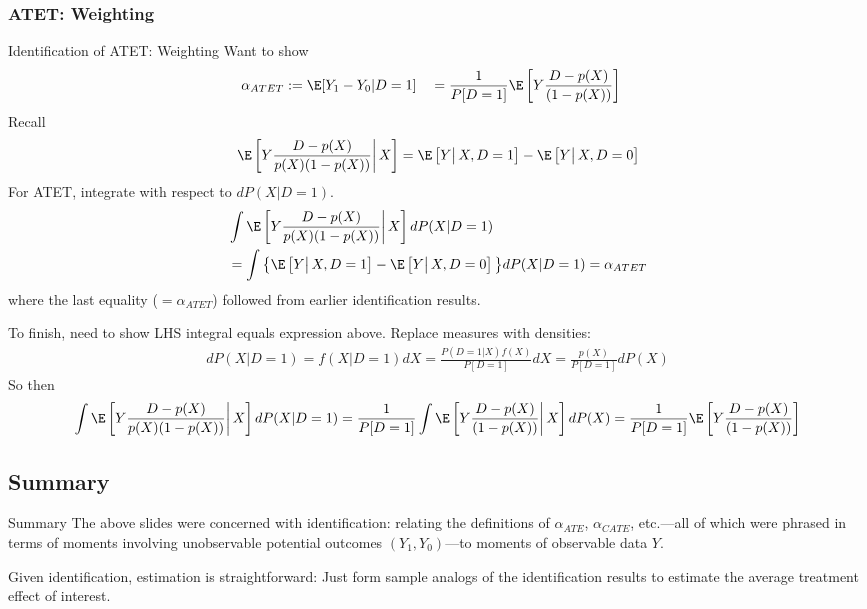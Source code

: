 \documentclass[aspectratio=169, handout]{beamer}
\begin{document}
\subsubsection{ATET: Weighting}

{\footnotesize
\begin{frame}{Identification of ATET: Weighting}
Want to show
\begin{align*}
  \alpha_{ATET}
  &:=
  \E[Y_1-Y_0|D=1]
  &&=
  \frac{1}{P[D=1]}
  \E\left[
    Y
    \frac{D-p(X)}{(1-p(X))}
  \right]
\end{align*}
Recall
\begin{align*}
  \E\left[
    Y
    \frac{D-p(X)}{p(X)(1-p(X))}
    \bigg|
    \,X
  \right]
  =
  \E\left[
    Y
    \big|
    \,X,D=1
  \right]
  -
  \E\left[
    Y
    \big|
    \,X,D=0
  \right]
\end{align*}
For ATET, integrate with respect to $dP(X|D=1)$.
\begin{align*}
  &
  \int
  \E\left[
    Y
    \frac{D-p(X)}{p(X)(1-p(X))}
    \bigg|
    \,X
  \right]
  dP(X|D=1)
  \\
  &=
  \int
  \big\{
  \E\left[
    Y
    \big|
    \,X,D=1
  \right]
  -
  \E\left[
    Y
    \big|
    \,X,D=0
  \right]
  \big\}
  dP(X|D=1)
  =
  \alpha_{ATET}
\end{align*}
where the last equality ($=\alpha_{ATET}$) followed from earlier
identification results.

To finish, need to show LHS integral equals expression above.
Replace measures with densities:
\begin{align*}
  dP(X|D=1)
  =
  f(X|D=1)
  dX
  =
  \frac{P(D=1|X)f(X)}{P[D=1]}
  dX
  =
  \frac{p(X)}{P[D=1]}
  dP(X)
\end{align*}
So then
\begin{align*}
  \int
  \E\left[
    Y
    \frac{D-p(X)}{p(X)(1-p(X))}
    \bigg|
    \,X
  \right]
  dP(X|D=1)
  =
  \frac{1}{P[D=1]}
  \int
  \E\left[
    Y
    \frac{D-p(X)}{(1-p(X))}
    \bigg|
    \,X
  \right]
  dP(X)
  =
  \frac{1}{P[D=1]}
  \E\left[
    Y
    \frac{D-p(X)}{(1-p(X))}
  \right]
\end{align*}
\end{frame}
}


\subsection{Summary}

{\footnotesize
\begin{frame}{Summary}
The above slides were concerned with \alert{identification}: relating
the definitions of $\alpha_{ATE}$, $\alpha_{CATE}$, etc.---all of which
were phrased in terms of moments involving \alert{unobservable}
potential outcomes $(Y_1,Y_0)$---to moments of \alert{observable} data
$Y$.

Given identification, estimation is straightforward:
Just form sample analogs of the identification results to estimate the
average treatment effect of interest.
\end{frame}
}
\end{document}
